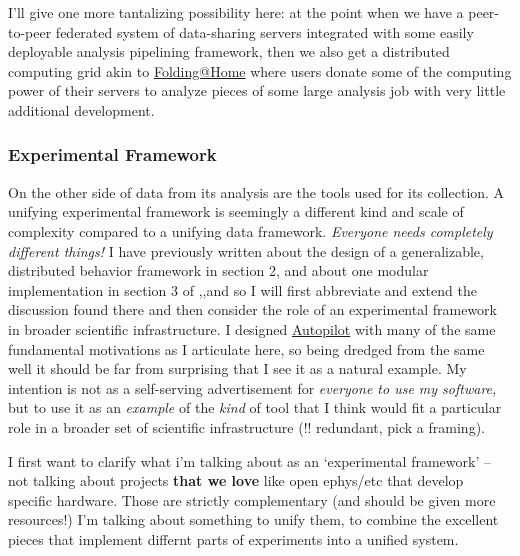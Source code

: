 \documentclass[nohyper]{tufte-book-jls}
\begin{document}
I'll give one more tantalizing possibility here: at the point when we
have a peer-to-peer federated system of data-sharing servers integrated
with some easily deployable analysis pipelining framework, then we also
get a distributed computing grid akin to
\href{https://foldingathome.org/}{Folding@Home} where users donate some
of the computing power of their servers to analyze pieces of some large
analysis job with very little additional development.

\hypertarget{experimental-framework}{%
\subsubsection{Experimental Framework}\label{experimental-framework}}

On the other side of data from its analysis are the tools used for its
collection. A unifying experimental framework is seemingly a different
kind and scale of complexity compared to a unifying data framework.
\emph{Everyone needs completely different things!} I have previously
written about the design of a generalizable, distributed behavior
framework in section 2, and about one modular implementation in section
3 of \cite{saundersAutopilotAutomatingBehavioral2019},,and so I
will first abbreviate and extend the discussion found there and then
consider the role of an experimental framework in broader scientific
infrastructure. I designed
\href{https://docs.auto-pi-lot.com}{Autopilot} with many of the same
fundamental motivations as I articulate here, so being dredged from the
same well it should be far from surprising that I see it as a natural
example. My intention is not as a self-serving advertisement for
\emph{everyone to use my software,} but to use it as an \emph{example}
of the \emph{kind} of tool that I think would fit a particular role in a
broader set of scientific infrastructure (!! redundant, pick a framing).

I first want to clarify what i'm talking about as an `experimental
framework' -- not talking about projects \textbf{that we love} like open
ephys/etc that develop specific hardware. Those are strictly
complementary (and should be given more resources!) I'm talking about
something to unify them, to combine the excellent pieces that implement
differnt parts of experiments into a unified system.
\end{document}
